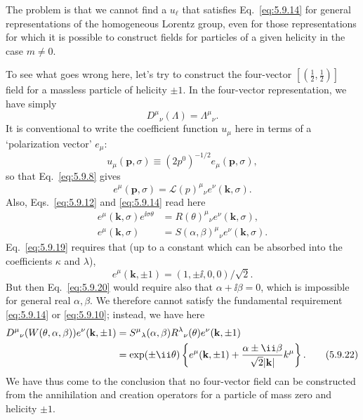 The problem is that we cannot find a $u_\ell$ that satisfies Eq.~\eqref{eq:5.9.14} for
general representations of the homogeneous Lorentz group, even for those
representations for which it is possible to construct fields for particles of
a given helicity in the case $m\neq0$.

To see what goes wrong here, let's try to construct the four-vector
$[(\tfrac12,\tfrac12)]$ field for a massless particle of helicity $\pm1$. In
the four-vector representation, we have simply
\[
D^\mu{}_\nu(\Lambda)=\Lambda^\mu{}_\nu.
\]
It is conventional to write the coefficient function $u_\mu$ here in terms of
a `polarization vector' $e_\mu$:
\begin{equation}
u_\mu(\mathbf p,\sigma)\equiv(2p^0)^{-1/2}e_\mu(\mathbf p,\sigma),
\tag{5.9.17}\label{eq:5.9.17}
\end{equation}
so that Eq.~\eqref{eq:5.9.8} gives
\begin{equation}
e^\mu(\mathbf p,\sigma)=\mathcal L(p)^\mu{}_\nu e^\nu(\mathbf k,\sigma).
\tag{5.9.18}\label{eq:5.9.18}
\end{equation}
Also, Eqs.~\eqref{eq:5.9.12} and \eqref{eq:5.9.14} read here
\begin{align}
e^\mu(\mathbf k,\sigma)e^{\ii\sigma\theta}
&=R(\theta)^\mu{}_\nu e^\nu(\mathbf k,\sigma),
\tag{5.9.19}\label{eq:5.9.19}\\
e^\mu(\mathbf k,\sigma)&=S(\alpha,\beta)^\mu{}_\nu
e^\nu(\mathbf k,\sigma).
\tag{5.9.20}\label{eq:5.9.20}
\end{align}
Eq.~\eqref{eq:5.9.19} requires that (up to a constant which can be absorbed into the
coefficients $\kappa$ and $\lambda$),
\begin{equation}
e^\mu(\mathbf k,\pm1)=(1,\pm \ii,0,0)/\sqrt2.
\tag{5.9.21}\label{eq:5.9.21}
\end{equation}
But then Eq.~\eqref{eq:5.9.20} would require also that $\alpha+\ii\beta=0$, which is
impossible for general real $\alpha,\beta$. We therefore cannot satisfy the
fundamental requirement \eqref{eq:5.9.14} or \eqref{eq:5.9.10}; instead, we have here
\begin{align}
D^\mu{}_\nu(W(\theta,\alpha,\beta))e^\nu(\mathbf k,\pm1)
&=S^\mu{}_\lambda(\alpha,\beta)R^\lambda{}_\nu(\theta)
e^\nu(\mathbf k,\pm1)
\notag\\
&=\exp(\pm \ii\theta)\left\{e^\mu(\mathbf k,\pm1)
+\frac{\alpha\pm \ii\beta}{\sqrt{2}|\mathbf k|}k^\mu\right\}.
\tag{5.9.22}\label{eq:5.9.22}
\end{align}
We have thus come to the conclusion that no four-vector field can be
constructed from the annihilation and creation operators for a particle of
mass zero and helicity $\pm1$.

